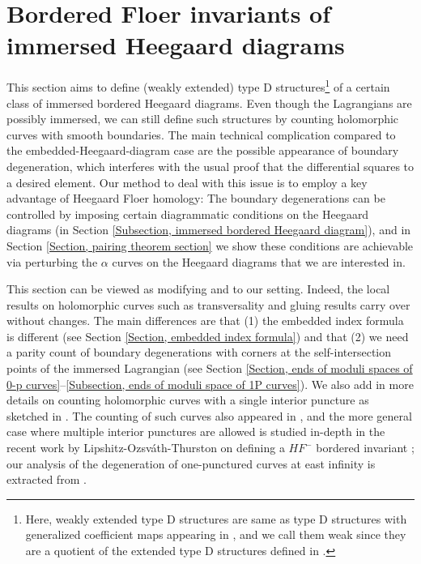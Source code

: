 \documentclass{amsart}
\theoremstyle{definition}
\theoremstyle{remark}
\numberwithin{equation}{section}
\numberwithin{equation}{section} \makeatletter
\begin{document}
\section{Bordered Floer invariants of immersed Heegaard diagrams}\label{Section, bordered invariants of immersed Heegaard diagrams}
This section aims to define (weakly extended) type D structures\footnote{Here, weakly extended type D structures are same as type D structures with generalized coefficient maps appearing in \cite[Chapter 11.6]{LOT18}, and we call them weak since they are a quotient of the extended type D structures defined in \cite{hanselman2016bordered}.} of a certain class of immersed bordered Heegaard diagrams. Even though the Lagrangians are possibly immersed, we can still define such structures by counting holomorphic curves with smooth boundaries. The main technical complication compared to the embedded-Heegaard-diagram case are the possible appearance of boundary degeneration, which interferes with the usual proof that the differential squares to a desired element. Our method to deal with this issue is to employ a key advantage of Heegaard Floer homology: The boundary degenerations can be controlled by imposing certain diagrammatic conditions on the Heegaard diagrams (in Section \ref{Subsection, immersed bordered Heegaard diagram}), and in Section \ref{Section, pairing theorem section} we show these conditions are achievable via perturbing the $\alpha$ curves on the Heegaard diagrams that we are interested in. 

This section can be viewed as modifying \cite[Chapter 5 and Chapter 11.6]{LOT18} and \cite[Errata]{LIPSHITZ2008} to our setting. Indeed, the local results on holomorphic curves such as transversality and gluing results carry over without changes. The main differences are that (1) the embedded index formula is different (see Section \ref{Section, embedded index formula}) and that (2) we need a parity count of boundary degenerations with corners at the self-intersection points of the immersed Lagrangian (see Section \ref{Section, ends of moduli spaces of 0-p curves}--\ref{Subsection, ends of moduli space of 1P curves}). We also add in more details on counting holomorphic curves with a single interior puncture as sketched in \cite[Errata]{LIPSHITZ2008}. The counting of such curves also appeared in \cite{Hanselman2022}, and the more general case where multiple interior punctures are allowed is studied in-depth in the recent work by Lipshitz-Ozsv\'ath-Thurston on defining a $HF^{-}$ bordered invariant \cite{Lipshitz2023}; our analysis of the degeneration of one-punctured curves at east infinity is extracted from \cite{Hanselman2022}. 
\end{document}
